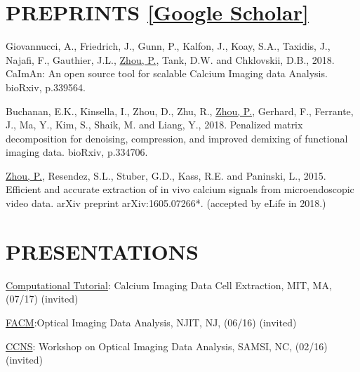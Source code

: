 \documentclass[paper=letter,fontsize=11pt]{scrartcl} %
\newcommand{\NewPart}[2]{\section*{\uppercase{#1} #2}}
\newcommand{\TalkEntry}[4]{
		\noindent #1, #2, #3 #4}
\begin{document}
\NewPart{Preprints}{\href{http://scholar.google.com/citations?hl=en&user=hw0JvzAAAAAJ}{[Google Scholar]}}

\begin{etaremune}

\item Giovannucci, A., Friedrich, J., Gunn, P., Kalfon, J., Koay, S.A., Taxidis, J., Najafi, F., Gauthier, J.L., \ul{Zhou, P.}, Tank, D.W. and Chklovskii, D.B., 2018. CaImAn: An open source tool for scalable Calcium Imaging data Analysis. bioRxiv, p.339564.

\item Buchanan, E.K., Kinsella, I., Zhou, D., Zhu, R., \ul{Zhou, P.}, Gerhard, F., Ferrante, J., Ma, Y., Kim, S., Shaik, M. and Liang, Y., 2018. Penalized matrix decomposition for denoising, compression, and improved demixing of functional imaging data. bioRxiv, p.334706.

\item \ul{Zhou, P.}, Resendez, S.L., Stuber, G.D., Kass, R.E. and Paninski, L., 2015. Efficient and accurate extraction of in vivo calcium signals from microendoscopic video data. arXiv preprint arXiv:1605.07266*. ({\color{blue}accepted by eLife in 2018}.)
\end{etaremune}







\NewPart{Presentations}{}
\begin{etaremune}
\item \TalkEntry{\href{https://bcs.mit.edu/news-events/events/computational-tutorial-calcium-imaging-data-cell-extraction}{Computational Tutorial}: Calcium Imaging Data Cell Extraction}{MIT, MA}{(07/17)}{(invited)}
\item\TalkEntry{\href{https://m.njit.edu/Events/FACM16/program.html}{FACM}:Optical Imaging Data Analysis}{NJIT, NJ}{(06/16)}{(invited)} 

\item\TalkEntry{\href{https://www.samsi.info/programs-and-activities/research-workshops/2015-16-ccns-workshop-on-optical-imaging-data-analysis-february-1-2-2016/}{CCNS}: Workshop on Optical Imaging Data Analysis}{SAMSI, NC}{(02/16)}{(invited)} 

\end{etaremune}
\end{document}
